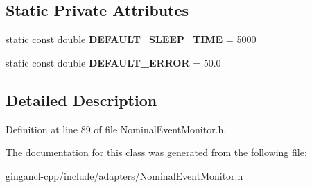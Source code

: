 \subsection*{Static Private Attributes}
\begin{CompactItemize}
\item 
static const double {\bf DEFAULT\_\-SLEEP\_\-TIME} = 5000\label{classbr_1_1pucrio_1_1telemidia_1_1ginga_1_1ncl_1_1adapters_1_1NominalEventMonitor_d9d15ed37db51872b15c44375107df4d}

\item 
static const double {\bf DEFAULT\_\-ERROR} = 50.0\label{classbr_1_1pucrio_1_1telemidia_1_1ginga_1_1ncl_1_1adapters_1_1NominalEventMonitor_93f57639c79f67b9efde08b419ec3a20}

\end{CompactItemize}


\subsection{Detailed Description}




Definition at line 89 of file NominalEventMonitor.h.

The documentation for this class was generated from the following file:\begin{CompactItemize}
\item 
gingancl-cpp/include/adapters/NominalEventMonitor.h\end{CompactItemize}
